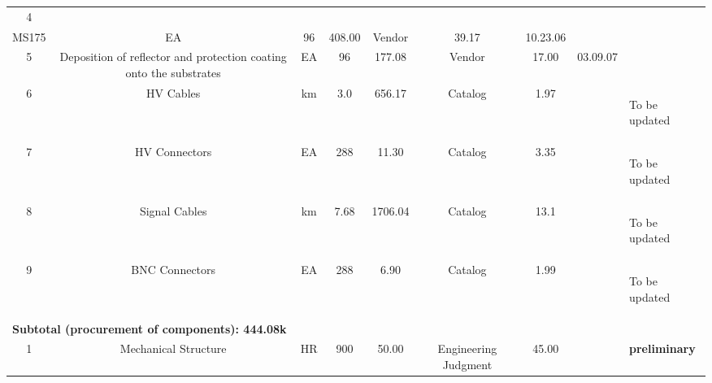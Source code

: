 \begin{table}
\begin{tabular}{|c|c|c|c|c|c|c|p{1.5cm}|p{2.2cm}|}
4 & \begin{minipage}[c]{0.2\textwidth} Magnetic Shield, \\ MS175 \end{minipage} & EA & 96 & 408.00 & Vendor & 39.17 & 10.23.06 & \\ \hline
5 & \begin{minipage}[c]{0.2\textwidth} Deposition of reflector   and protection coating  onto the substrates \end{minipage} & EA & 96 & 177.08 & Vendor & 17.00 & 03.09.07 & \\ \hline
6 & HV Cables & km & 3.0 & 656.17 & Catalog & 1.97 & & \begin{minipage}[c]{2.2cm} \begin{center} To be  updated \end{center}\end{minipage} \\ \hline
7 & HV Connectors & EA & 288 & 11.30 & Catalog &3.35 & & \begin{minipage}[c]{2.2cm} \begin{center} To be  updated \end{center}\end{minipage} \\ \hline
8 & Signal Cables & km & 7.68 & 1706.04 & Catalog & 13.1 & & \begin{minipage}[c]{2.2cm} \begin{center} To be  updated\end{center} \end{minipage} \\ \hline
9 & BNC Connectors & EA & 288 & 6.90 & Catalog & 1.99 & & \begin{minipage}[c]{2.2cm}\begin{center} To be  updated \end{center}\end{minipage} \\ \hline
\multicolumn{9}{|l|}{ \bf \hspace{0.5cm} Subtotal (procurement of components): \hspace{1.6cm} 444.08k }  \\ \hline
1 & \begin{minipage}[c]{0.2\textwidth} Mechanical Structure \end{minipage} & HR & 900 & 50.00 & \begin{minipage}[c]{0.12\textwidth} Engineering Judgment \end{minipage} &45.00 & & \begin{minipage}[c]{2.2cm} {\bf preliminary} \end{minipage} \\ \hline 

\end{tabular}
\end{table}
